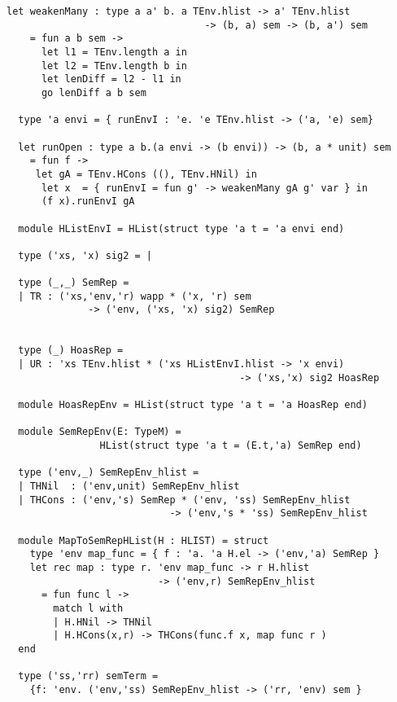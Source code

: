 \documentclass[uplatex]{sumiilab-paper}
\theoremstyle{mystyle}
\numberwithin{definition}{chapter} %
\begin{document}
\begin{lstlisting}[caption=OCaml版EbUの実装,label=src:unembedding_ocaml]
  let weakenMany : type a a' b. a TEnv.hlist -> a' TEnv.hlist 
                                  -> (b, a) sem -> (b, a') sem 
    = fun a b sem ->
      let l1 = TEnv.length a in 
      let l2 = TEnv.length b in 
      let lenDiff = l2 - l1 in 
      go lenDiff a b sem

  type 'a envi = { runEnvI : 'e. 'e TEnv.hlist -> ('a, 'e) sem}

  let runOpen : type a b.(a envi -> (b envi)) -> (b, a * unit) sem
    = fun f ->
     let gA = TEnv.HCons ((), TEnv.HNil) in 
      let x  = { runEnvI = fun g' -> weakenMany gA g' var } in 
      (f x).runEnvI gA

  module HListEnvI = HList(struct type 'a t = 'a envi end)

  type ('xs, 'x) sig2 = |

  type (_,_) SemRep = 
  | TR : ('xs,'env,'r) wapp * ('x, 'r) sem 
              -> ('env, ('xs, 'x) sig2) SemRep


  type (_) HoasRep =
  | UR : 'xs TEnv.hlist * ('xs HListEnvI.hlist -> 'x envi) 
                                        -> ('xs,'x) sig2 HoasRep 

  module HoasRepEnv = HList(struct type 'a t = 'a HoasRep end)

  module SemRepEnv(E: TypeM) = 
                HList(struct type 'a t = (E.t,'a) SemRep end)

  type ('env,_) SemRepEnv_hlist =
  | THNil  : ('env,unit) SemRepEnv_hlist
  | THCons : ('env,'s) SemRep * ('env, 'ss) SemRepEnv_hlist 
                            -> ('env,'s * 'ss) SemRepEnv_hlist
 
  module MapToSemRepHList(H : HLIST) = struct 
    type 'env map_func = { f : 'a. 'a H.el -> ('env,'a) SemRep }
    let rec map : type r. 'env map_func -> r H.hlist 
                          -> ('env,r) SemRepEnv_hlist 
      = fun func l ->
        match l with 
        | H.HNil -> THNil
        | H.HCons(x,r) -> THCons(func.f x, map func r )   
  end

  type ('ss,'rr) semTerm = 
    {f: 'env. ('env,'ss) SemRepEnv_hlist -> ('rr, 'env) sem }


\end{lstlisting}
\end{document}
